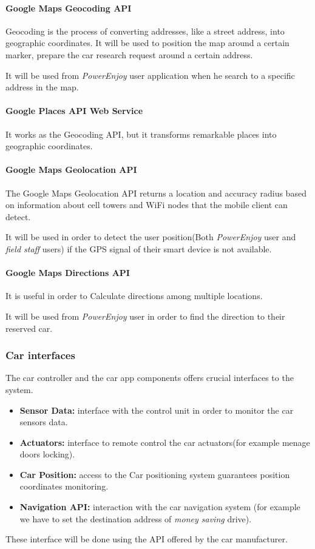 \documentclass[english]{article}
\newcommand{\powerenjoy}{\textit{PowerEnjoy }}
\newcommand{\fieldstaff}{\textit{field staff }}
\newcommand{\moneysaving}{\textit{money saving }}
\begin{document}
	\paragraph {Google Maps Geocoding API}
		Geocoding is the process of converting addresses, like a street address, into geographic coordinates. It will be used to position the map around a certain marker, prepare the car research request around a certain address.
		\par It will be used from \powerenjoy user application when he search to a specific address in the map.
	\paragraph {Google Places API Web Service}
		It works as the Geocoding API,  but it transforms remarkable places into geographic coordinates.
	\paragraph {Google Maps Geolocation API}
		The Google Maps Geolocation API returns a location and accuracy radius based on information about cell towers and WiFi nodes that the mobile client can detect. \par It will be used in order to detect the user position(Both \powerenjoy user and \fieldstaff users)  if the GPS signal of their smart device is not available.
	
	\paragraph {Google Maps Directions API}
		It is useful in order to Calculate directions among multiple locations.
		\par It will be used from \powerenjoy user in order to find the direction to their reserved car.
	
	\subsubsection*{Car interfaces}
	The car controller and the car app components offers crucial interfaces to the system. 
	\begin{itemize}
		\item \textbf{Sensor Data:} interface with the control unit in order to monitor the car sensors data.
		\item\textbf{Actuators:} interface to remote control the car actuators(for example menage doors locking).
		\item \textbf{Car Position:} access to the Car positioning system guarantees position coordinates monitoring.
		\item \textbf{Navigation API:} interaction with the car navigation system (for example we have to set the destination address of \moneysaving drive).
	\end{itemize}
	These interface will be done using the API offered by the car manufacturer.
\end{document}
